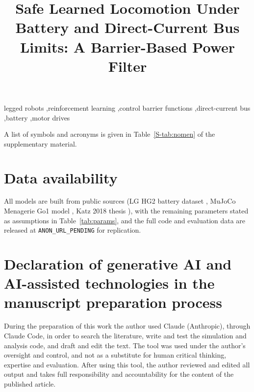 \documentclass[preprint,12pt,a4paper]{elsarticle}
\theoremstyle{remark}
\newcommand{\papertitle}{Safe Learned Locomotion Under Battery and Direct-Current Bus Limits: A Barrier-Based Power Filter}
\newcommand{\dataurl}{\texttt{ANON\_URL\_PENDING}}
\begin{document}
\begin{frontmatter}
\title{\papertitle}
\begin{abstract}

\end{abstract}
\begin{keyword}
legged robots \sep reinforcement learning \sep control barrier functions \sep direct-current bus \sep battery \sep motor drives
\end{keyword}
\end{frontmatter}
\noindent A list of symbols and acronyms is given in Table~\ref{S-tab:nomen} of the supplementary material.









\clearpage %
\section*{Data availability}
All models are built from public sources (LG HG2 battery dataset \cite{kollmeyer2020hg2}, MuJoCo Menagerie Go1 model \cite{zakka2022menagerie}, Katz 2018 thesis \cite{katz2018actuator}), with the remaining parameters stated as assumptions in Table~\ref{tab:params}, and the full code and evaluation data are released at \dataurl{} for replication.

\section*{Declaration of generative AI and AI-assisted technologies in the manuscript preparation process}
During the preparation of this work the author used Claude (Anthropic), through Claude Code, in order to search the literature, write and test the simulation and analysis code, and draft and edit the text. The tool was used under the author's oversight and control, and not as a substitute for human critical thinking, expertise and evaluation. After using this tool, the author reviewed and edited all output and takes full responsibility and accountability for the content of the published article.


\end{document}
